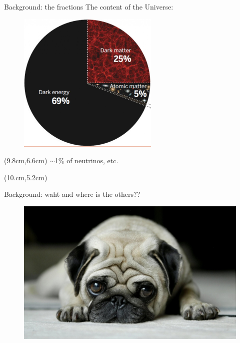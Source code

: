\documentclass[aspectratio=43]{beamer}
\begin{document}
\begin{frame}{Background: the fractions}
The content of the Universe:
  \begin{figure}
    \includegraphics[width=0.6\textwidth]{fraction.jpg}
  \end{figure}
  \begin{textblock*}{3cm}(9.8cm,6.6cm)
    {$\sim$1\% of neutrinos, etc.}
  \end{textblock*}
  \begin{textblock*}{2.6cm}(10.cm,5.2cm)
    {\color{red}{Stars only account for $\sim$0.07\%}}
  \end{textblock*}
\end{frame}

\begin{frame}{Background: waht and where is the others??}
  \begin{figure}
    \includegraphics[width=\textwidth]{lonely-dog.jpg}
  \end{figure}
\end{frame}
\end{document}
